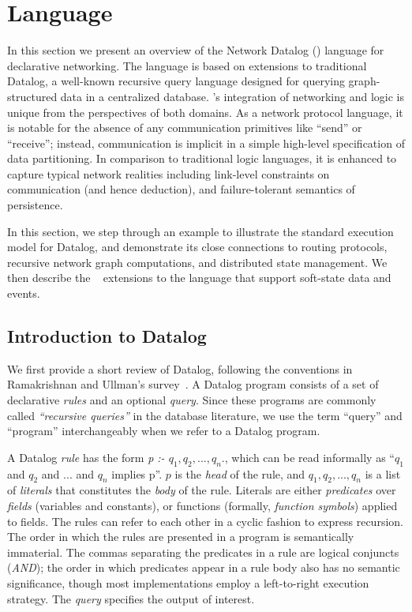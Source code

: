 \section{Language}
\label{sec:language}


In this section we present an overview of the Network Datalog
(\Dlog) language for declarative networking. The \Dlog language is
based on extensions to traditional Datalog, a well-known recursive
query language designed for querying graph-structured
data in a centralized database. \Dlog's integration of networking and
logic is unique from the perspectives of both domains.  As a network
protocol language, it is notable for the absence of any communication
primitives like ``send'' or ``receive''; instead, communication is
implicit in a simple high-level specification of data partitioning.
In comparison to traditional logic languages, it is enhanced to
capture typical network realities including link-level constraints on
communication (and hence deduction), and failure-tolerant semantics of
persistence.

In this section, we step through an example to illustrate the standard
execution model for Datalog, and demonstrate its close connections to
routing protocols, recursive network graph computations, and
distributed state management. We then describe the
\Overlog~\cite{declareOverlays} extensions to the \Dlog language that
support soft-state data and events.

  

\subsection{Introduction to Datalog}
\label{sec:language: Datalog}

We first provide a short review of Datalog, following the conventions in
Ramakrishnan and Ullman's survey~\cite{ramakrishnan93survey}. A Datalog
program consists of a set of declarative {\em rules} and an optional
{\em query}. Since these programs are commonly called {\em ``recursive
  queries''} in the database literature, we use the term ``query'' and
``program'' interchangeably when we refer to a Datalog program.

A Datalog {\em rule} has the form {\em p :- $q_{1}, q_{2}, ...,
  q_{n}$}., which can be read informally as ``$q_{1}$ and $q_{2}$ and
$ ... $ and $q_{n}$ implies p''. $p$ is the {\em head} of the rule,
and $q_{1}, q_{2}, ..., q_{n}$ is a list of {\em literals} that
constitutes the {\em body} of the rule.  Literals are either {\em
  predicates} over {\em fields} (variables and constants), or functions
(formally, \emph{function symbols}) applied to fields. The rules can refer to each other in a
cyclic fashion to express recursion. The order in which the rules are
presented in a program is semantically immaterial.  The commas
separating the predicates in a rule are logical conjuncts ({\em AND});
the order in which predicates appear in a rule body also has no
semantic significance, though most implementations %
employ a left-to-right execution strategy. The {\em query} specifies
the output of interest.

